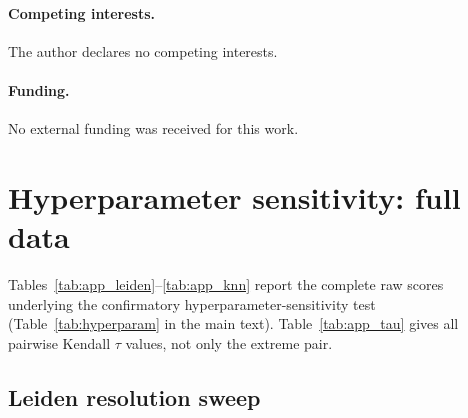 \documentclass[10pt,letterpaper]{article}
\begin{document}
\paragraph{Competing interests.} The author declares no competing interests.

\paragraph{Funding.} No external funding was received for this work.


\appendix

\section{Hyperparameter sensitivity: full data}
\label{app:hyperparam}

Tables~\ref{tab:app_leiden}--\ref{tab:app_knn} report the complete raw scores underlying the confirmatory hyperparameter-sensitivity test (Table~\ref{tab:hyperparam} in the main text). Table~\ref{tab:app_tau} gives all pairwise Kendall $\tau$ values, not only the extreme pair.

\subsection{Leiden resolution sweep}
\end{document}
